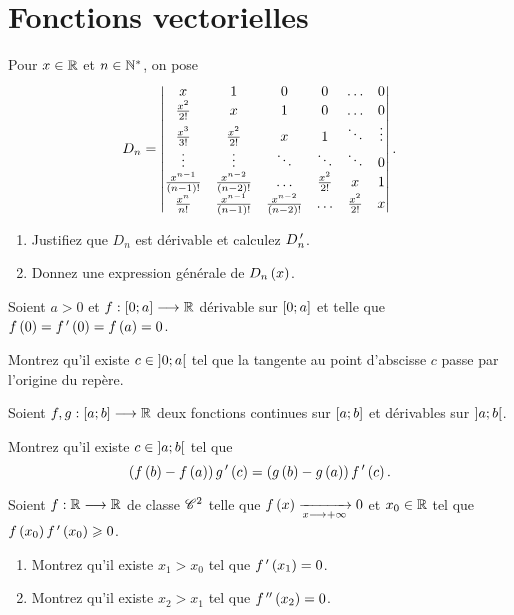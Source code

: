 \chapter{Fonctions vectorielles}

\minitoc

\legendeexercices

\begin{exoss}
Pour \(x\in\mathbb{R}\) et \(n\in\mathbb{N}^*\), on pose \[D_n=\begin{vmatrix}
x & 1 & 0 & 0 & \dots & 0 \\
\frac{x^2}{2!} & x & 1 & 0 & \dots & 0 \\
\frac{x^3}{3!} & \frac{x^2}{2!} & x & 1 & \ddots & \vdots \\
\vdots & \vdots & \ddots & \ddots & \ddots & 0 \\
\frac{x^{n-1}}{\left(n-1\right)!} & \frac{x^{n-2}}{\left(n-2\right)!} & \dots & \frac{x^2}{2!} & x & 1 \\
\frac{x^n}{n!} & \frac{x^{n-1}}{\left(n-1\right)!} & \frac{x^{n-2}}{\left(n-2\right)!} & \dots & \frac{x^2}{2!} & x
\end{vmatrix}.\]

\begin{enumerate}
    \item Justifiez que \(D_n\) est dérivable et calculez \(D_n^{\,\prime}\). \\
    \item Donnez une expression générale de \(D_n\left(x\right)\).
\end{enumerate}
\end{exoss}

\begin{exoss}
Soient \(a>0\) et \(f:\left[0;a\right]\longrightarrow\mathbb{R}\) dérivable sur \(\left[0;a\right]\) et telle que \(f\left(0\right)=f^{\,\prime}\left(0\right)=f\left(a\right)=0\).

Montrez qu'il existe \(c\in\left]0;a\right[\) tel que la tangente au point d'abscisse \(c\) passe par l'origine du repère.
\end{exoss}

\begin{exoss}
Soient \(f,g:\left[a;b\right]\longrightarrow\mathbb{R}\) deux fonctions continues sur \(\left[a;b\right]\) et dérivables sur \(\left]a;b\right[\).

Montrez qu'il existe \(c\in\left]a;b\right[\) tel que \[\left(f\left(b\right)-f\left(a\right)\right)g^{\,\prime}\left(c\right)=\left(g\left(b\right)-g\left(a\right)\right)f^{\,\prime}\left(c\right).\]
\end{exoss}

\begin{exoss}
Soient \(f:\mathbb{R}\longrightarrow\mathbb{R}\) de classe \(\mathscr{C}^{2}\) telle que \(f\left(x\right)\xrightarrow[x\longrightarrow+\infty]{}0\) et \(x_0\in\mathbb{R}\) tel que \(f\left(x_0\right)f^{\,\prime}\left(x_0\right)\geqslant0\).

\begin{enumerate}
    \item Montrez qu'il existe \(x_1>x_0\) tel que \(f^{\,\prime}\left(x_1\right)=0\). \\
    \item Montrez qu'il existe \(x_2>x_1\) tel que \(f^{\,\prime\prime}\left(x_2\right)=0\).
\end{enumerate}
\end{exoss}

